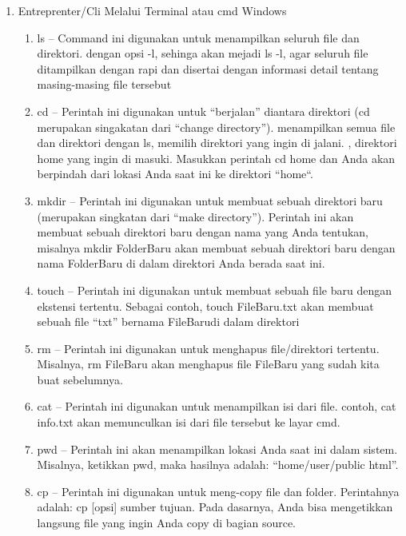 \begin{enumerate}
\item Entreprenter/Cli Melalui Terminal atau cmd Windows
    
    \begin{enumerate}
    \item ls – Command ini digunakan untuk menampilkan seluruh file dan direktori.  dengan opsi -l, sehinga akan mejadi ls -l, agar seluruh file ditampilkan dengan rapi dan disertai dengan informasi detail tentang masing-masing file tersebut
    
    \item cd – Perintah ini digunakan untuk “berjalan” diantara direktori (cd merupakan singakatan dari “change directory”). menampilkan semua file dan direktori dengan ls, memilih direktori yang ingin di jalani. , direktori home yang ingin di masuki. Masukkan perintah cd home dan Anda akan berpindah dari lokasi Anda saat ini ke direktori “home“.
    
    \item mkdir – Perintah ini digunakan untuk membuat sebuah direktori baru (merupakan singkatan dari “make directory”). Perintah ini akan membuat sebuah direktori baru dengan nama yang Anda tentukan, misalnya mkdir FolderBaru akan membuat sebuah direktori baru dengan nama FolderBaru di dalam direktori Anda berada saat ini.
    
    \item touch – Perintah ini digunakan untuk membuat sebuah file baru dengan ekstensi tertentu. Sebagai contoh, touch FileBaru.txt akan membuat sebuah file “txt” bernama FileBarudi dalam direktori 
    
    \item rm – Perintah ini digunakan untuk menghapus file/direktori tertentu. Misalnya, rm FileBaru akan menghapus file FileBaru yang sudah kita buat sebelumnya.
  
    \item cat – Perintah ini digunakan untuk menampilkan isi dari file. contoh, cat info.txt akan memunculkan isi dari file tersebut ke layar cmd.
    
    \item pwd – Perintah ini akan menampilkan lokasi Anda saat ini dalam sistem. Misalnya, ketikkan pwd, maka hasilnya adalah: “home/user/public html”.
    
    \item cp – Perintah ini digunakan untuk meng-copy file dan folder. Perintahnya adalah: cp [opsi] sumber tujuan. Pada dasarnya, Anda bisa mengetikkan langsung file yang ingin Anda copy di bagian source. 
    \end{enumerate}
    

\end{enumerate}
